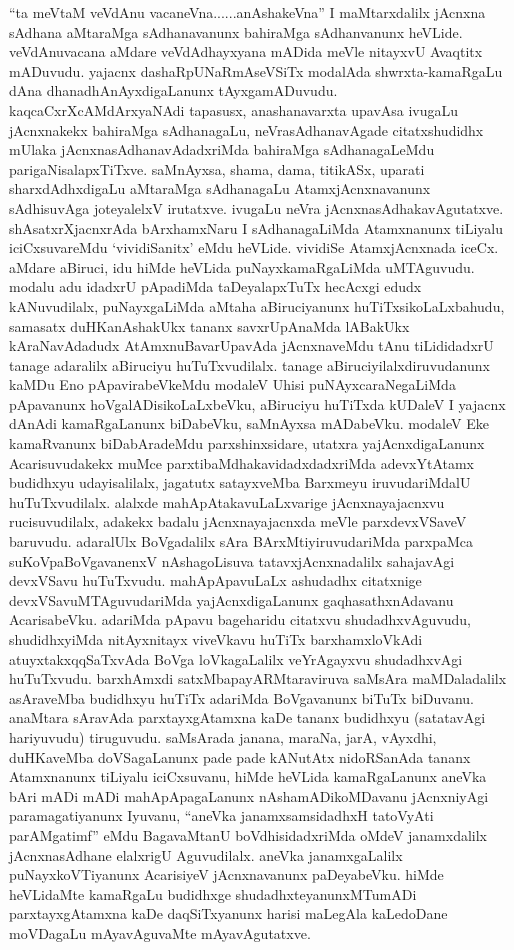 \begin{artha}
``ta meVtaM veVdAnu vacaneVna......anAshakeVna'' I maMtarxdalilx jAcnxna sAdhana aMtaraMga sAdhanavanunx bahiraMga sAdhanvanunx heVLide. veVdAnuvacana aMdare veVdAdhayxyana mADida meVle nitayxvU Avaqtitx mADuvudu. yajacnx dashaRpUNaRmAseVSiTx modalAda shwrxta-kamaRgaLu dAna dhanadhAnAyxdigaLanunx tAyxgamADuvudu. kaqcaCxrXcAMdArxyaNAdi tapasusx, anashanavarxta upavAsa ivugaLu jAcnxnakekx bahiraMga sAdhanagaLu, neVrasAdhanavAgade citatxshudidhx mUlaka jAcnxnasAdhanavAdadxriMda bahiraMga sAdhanagaLeMdu parigaNisalapxTiTxve. saMnAyxsa, shama, dama, titikASx, uparati sharxdAdhxdigaLu aMtaraMga sAdhanagaLu AtamxjAcnxnavanunx sAdhisuvAga joteyalelxV irutatxve. ivugaLu neVra jAcnxnasAdhakavAgutatxve. shAsatxrXjacnxrAda bArxhamxNaru I sAdhanagaLiMda Atamxnanunx tiLiyalu iciCxsuvareMdu `vividiSanitx' eMdu heVLide. vividiSe AtamxjAcnxnada iceCx. aMdare aBiruci, idu hiMde heVLida puNayxkamaRgaLiMda uMTAguvudu. modalu adu idadxrU pApadiMda taDeyalapxTuTx hecAcxgi edudx kANuvudilalx, puNayxgaLiMda aMtaha aBiruciyanunx huTiTxsikoLaLxbahudu, samasatx duHKanAshakUkx tananx savxrUpAnaMda lABakUkx kAraNavAdadudx AtAmxnuBavarUpavAda jAcnxnaveMdu tAnu tiLididadxrU tanage adaralilx aBiruciyu huTuTxvudilalx. tanage aBiruciyilalxdiruvudanunx kaMDu Eno pApavirabeVkeMdu modaleV Uhisi puNAyxcaraNegaLiMda pApavanunx hoVgalADisikoLaLxbeVku, aBiruciyu huTiTxda kUDaleV I yajacnx dAnAdi kamaRgaLanunx biDabeVku, saMnAyxsa mADabeVku. modaleV Eke kamaRvanunx biDabAradeMdu parxshinxsidare, utatxra \ndash  yajAcnxdigaLanunx Acarisuvudakekx muMce parxtibaMdhakavidadxdadxriMda adevxYtAtamx budidhxyu udayisalilalx, jagatutx satayxveMba Barxmeyu iruvudariMdalU huTuTxvudilalx. alalxde mahApAtakavuLaLxvarige jAcnxnayajacnxvu rucisuvudilalx, adakekx badalu jAcnxnayajacnxda meVle parxdevxVSaveV baruvudu. adaralUlx BoVgadalilx sAra BArxMtiyiruvudariMda parxpaMca suKoVpaBoVgavanenxV nAshagoLisuva tatavxjAcnxnadalilx sahajavAgi devxVSavu huTuTxvudu. mahApApavuLaLx ashudadhx citatxnige devxVSavuMTAguvudariMda yajAcnxdigaLanunx gaqhasathxnAdavanu AcarisabeVku. adariMda pApavu bageharidu citatxvu shudadhxvAguvudu, shudidhxyiMda nitAyxnitayx viveVkavu huTiTx barxhamxloVkAdi atuyxtakxqqSaTxvAda BoVga loVkagaLalilx veYrAgayxvu shudadhxvAgi huTuTxvudu. barxhAmxdi satxMbapayARMtaraviruva saMsAra maMDaladalilx asAraveMba budidhxyu huTiTx adariMda BoVgavanunx biTuTx biDuvanu. anaMtara sAravAda parxtayxgAtamxna kaDe tananx budidhxyu (satatavAgi hariyuvudu) tiruguvudu. saMsArada janana, maraNa, jarA, vAyxdhi, duHKaveMba doVSagaLanunx pade pade kANutAtx nidoRSanAda tananx Atamxnanunx tiLiyalu iciCxsuvanu, hiMde heVLida kamaRgaLanunx aneVka bAri mADi mADi mahApApagaLanunx nAshamADikoMDavanu jAcnxniyAgi paramagatiyanunx Iyuvanu, ``aneVka janamxsamsidadhxH tatoVyAti parAMgatimf'' eMdu BagavaMtanU boVdhisidadxriMda oMdeV janamxdalilx jAcnxnasAdhane elalxrigU Aguvudilalx. aneVka janamxgaLalilx puNayxkoVTiyanunx AcarisiyeV jAcnxnavanunx paDeyabeVku. hiMde heVLidaMte kamaRgaLu budidhxge shudadhxteyanunxMTumADi parxtayxgAtamxna kaDe daqSiTxyanunx harisi maLegAla kaLedoDane moVDagaLu mAyavAguvaMte mAyavAgutatxve.
\end{artha}

